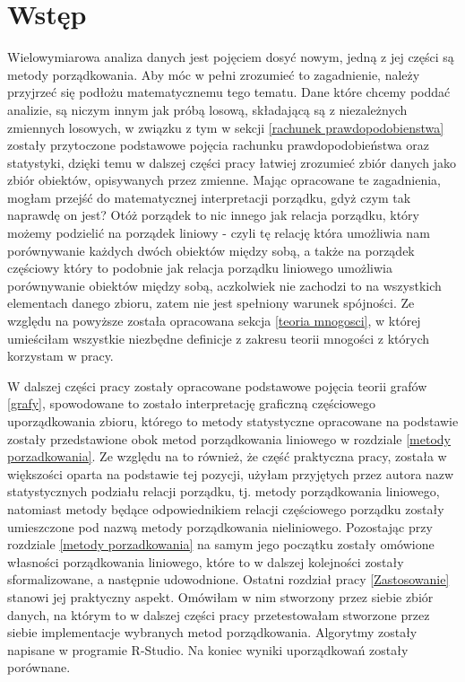 \documentclass[12pt,a4paper]{report}
\begin{document}
\chapter{Wstęp}
Wielowymiarowa analiza danych jest pojęciem dosyć nowym, jedną z jej części są metody porządkowania. Aby móc w pełni zrozumieć to zagadnienie, należy przyjrzeć się podłożu matematycznemu tego tematu. 
Dane które chcemy poddać analizie, są niczym innym jak próbą losową, składającą są z niezależnych zmiennych losowych, w związku z tym w sekcji \ref{rachunek prawdopodobienstwa} zostały przytoczone podstawowe pojęcia rachunku prawdopodobieństwa oraz statystyki, dzięki temu w dalszej części pracy łatwiej zrozumieć zbiór danych jako zbiór obiektów, opisywanych przez zmienne. Mając opracowane te zagadnienia, mogłam przejść do matematycznej interpretacji porządku, gdyż czym tak naprawdę on jest? Otóż porządek to nic innego jak relacja porządku, który możemy podzielić na porządek liniowy - czyli tę relację która umożliwia nam porównywanie każdych dwóch obiektów między sobą, a także na porządek częściowy który to podobnie jak relacja porządku liniowego umożliwia porównywanie obiektów między sobą, aczkolwiek nie zachodzi to na wszystkich elementach danego zbioru, zatem nie jest spełniony warunek spójności. Ze względu na powyższe została opracowana sekcja \ref{teoria mnogosci}, w której umieściłam wszystkie niezbędne definicje z zakresu teorii mnogości z których korzystam w pracy. 

W dalszej części pracy zostały opracowane podstawowe pojęcia teorii grafów \ref{grafy}, spowodowane to zostało interpretację graficzną częściowego uporządkowania zbioru, którego to metody statystyczne opracowane na podstawie \citep{panek2013} zostały przedstawione obok metod porządkowania liniowego w rozdziale \ref{metody porzadkowania}. Ze względu na to również, że część praktyczna pracy, została w większości oparta na podstawie  tej pozycji, użyłam przyjętych przez autora nazw statystycznych podziału relacji porządku, tj. metody porządkowania liniowego, natomiast metody będące odpowiednikiem relacji częściowego porządku zostały umieszczone pod nazwą metody porządkowania nieliniowego. Pozostając przy rozdziale \ref{metody porzadkowania} na samym jego początku zostały omówione własności porządkowania liniowego, które to w dalszej  kolejności zostały sformalizowane, a następnie udowodnione. 
Ostatni rozdział pracy \ref{Zastosowanie} stanowi jej praktyczny aspekt. Omówiłam w nim stworzony przez siebie zbiór danych, na którym to w dalszej części pracy przetestowałam stworzone przez siebie implementacje wybranych metod porządkowania. Algorytmy zostały napisane w programie R-Studio.  Na koniec wyniki uporządkowań zostały porównane.
\end{document}
